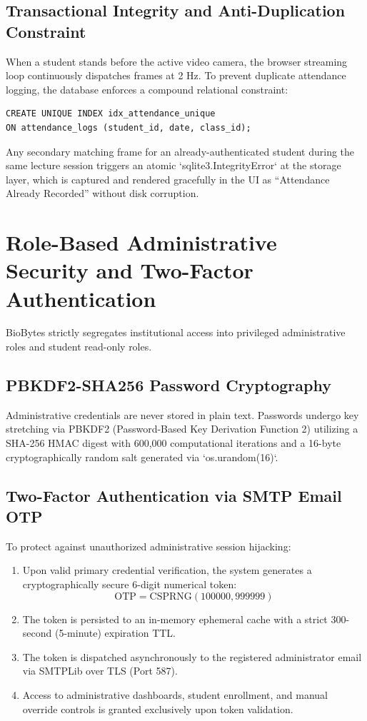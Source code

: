 \documentclass[12pt,a4paper,oneside]{report}
\begin{document}
\subsection{Transactional Integrity and Anti-Duplication Constraint}
When a student stands before the active video camera, the browser streaming loop continuously dispatches frames at 2 Hz. To prevent duplicate attendance logging, the database enforces a compound relational constraint:
\begin{verbatim}
CREATE UNIQUE INDEX idx_attendance_unique 
ON attendance_logs (student_id, date, class_id);
\end{verbatim}
Any secondary matching frame for an already-authenticated student during the same lecture session triggers an atomic `sqlite3.IntegrityError` at the storage layer, which is captured and rendered gracefully in the UI as ``Attendance Already Recorded'' without disk corruption.

\section{Role-Based Administrative Security and Two-Factor Authentication}
BioBytes strictly segregates institutional access into privileged administrative roles and student read-only roles.

\subsection{PBKDF2-SHA256 Password Cryptography}
Administrative credentials are never stored in plain text. Passwords undergo key stretching via PBKDF2 (Password-Based Key Derivation Function 2) utilizing a SHA-256 HMAC digest with 600,000 computational iterations and a 16-byte cryptographically random salt generated via `os.urandom(16)`.

\subsection{Two-Factor Authentication via SMTP Email OTP}
To protect against unauthorized administrative session hijacking:
\begin{enumerate}
    \item Upon valid primary credential verification, the system generates a cryptographically secure 6-digit numerical token:
    \begin{equation}
    \text{OTP} = \text{CSPRNG}(100000, 999999)
    \end{equation}
    \item The token is persisted to an in-memory ephemeral cache with a strict 300-second (5-minute) expiration TTL.
    \item The token is dispatched asynchronously to the registered administrator email via SMTPLib over TLS (Port 587).
    \item Access to administrative dashboards, student enrollment, and manual override controls is granted exclusively upon token validation.
\end{enumerate}
\end{document}
